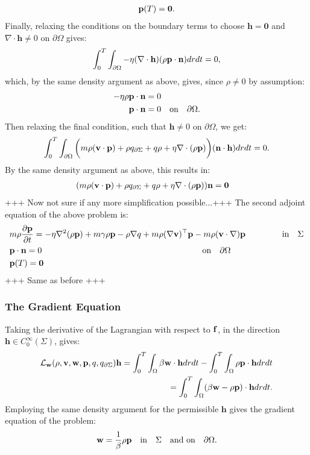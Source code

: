 \begin{align}
\mathbf{p}(T)=\mathbf{0}.
\end{align}
Finally, relaxing the conditions on the boundary terms to choose $\mathbf{h}=\mathbf{0}$ and $\nabla \cdot \mathbf{h}  \neq 0$ on $\partial \Omega$ gives:
\begin{align*}
\int_0^T \int_{\partial \Omega} -   \eta (\nabla \cdot \mathbf{h}) (\rho \mathbf{p} \cdot \mathbf{n})  dr dt = 0,
\end{align*}
which, by the same density argument as above, gives, since $\rho \neq 0$ by assumption:
\begin{align}
\label{CondAdj1}
- \eta  \rho \mathbf{p}  \cdot \mathbf{n}&= 0  \notag\\
 \mathbf{p}  \cdot \mathbf{n} &= 0 \quad \text{on} \quad \partial \Omega.
\end{align}
Then relaxing the final condition, such that $\mathbf{h} \neq 0$ on $\partial \Omega$, we get:
\begin{align*}
\int_0^T \int_{\partial\Omega} \bigg( m \rho (\mathbf{v} \cdot \mathbf{p})+\rho  {q}_{\partial \Sigma} + q \rho + \eta\nabla \cdot(\rho \mathbf{p})\bigg) ( \mathbf{n}\cdot \mathbf{h})dr dt=0.
\end{align*}
By the same density argument as above, this results in:
\begin{align*}
&(  m \rho (\mathbf{v} \cdot \mathbf{p})+\rho  {q}_{\partial \Sigma} + q \rho + \eta\nabla \cdot(\rho \mathbf{p})) \mathbf{n} =\mathbf{0}
\end{align*}
+++ Now not sure if any more simplification possible...+++
The second adjoint equation of the above problem is:
\begin{align*}
 &m\rho \frac{\partial \mathbf{p}}{\partial t}  = - \eta\nabla^2 (\rho \mathbf{p})  +m \gamma \rho \mathbf{p}-\rho\nabla q +m \rho (\nabla \mathbf{v})^\top\mathbf{p} 
-m \rho (\mathbf{v} \cdot \nabla)\mathbf{p}   \ \qquad\qquad \text{in} \quad \Sigma\\
&\mathbf{p} \cdot \mathbf{n} = 0 \qquad \qquad \qquad \qquad \qquad \qquad \qquad \qquad \qquad \quad \text{on} \quad \partial \Omega \\
&\mathbf{p}(T)=\mathbf{0}
\end{align*}
+++ Same as before +++
\subsubsection{The Gradient Equation}
Taking the derivative of the Lagrangian with respect to $\mathbf{f}$, in the direction $\mathbf{h} \in C_0^\infty(\Sigma)$, gives:
\begin{align*}
\mathcal{L}_{\mathbf{w}}(\rho,\mathbf{v},\mathbf{w},\mathbf{p},q,{q}_{\partial \Sigma}) \mathbf{h}= \int_0^T \int_\Omega \beta \mathbf{w} \cdot \mathbf{h} dr dt - \int_0^T \int_\Omega \rho \mathbf{p} \cdot \mathbf{h} dr dt \\
= \int_0^T \int_\Omega ( \beta \mathbf{w} - \rho \mathbf{p}) \cdot \mathbf{h} dr dt.
\end{align*}
Employing the same density argument for the permissible $\mathbf{h}$ gives the gradient equation of the problem:
\begin{align*}
 \mathbf{w} = \frac{1}{\beta} \rho \mathbf{p} \quad \text{in} \quad \Sigma \quad \text{and on} \quad \partial\Omega.
\end{align*}

